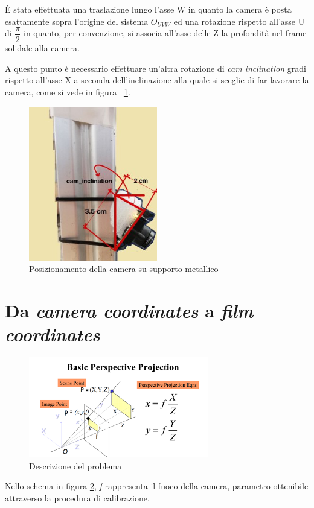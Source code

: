 È stata effettuata una traslazione lungo l'asse W in quanto la camera è posta esattamente sopra l'origine del sistema $O_{UVW}$ ed una rotazione rispetto all'asse U di $ \dfrac{\pi}{2}$ in quanto, per convenzione, si associa all'asse delle Z la profondità nel frame solidale alla camera.

A questo punto è necessario effettuare un'altra rotazione di \textit{cam inclination} gradi rispetto all'asse X a seconda dell'inclinazione alla quale si sceglie di far lavorare la camera, come si vede in figura ~\ref{fig:cameraSupport}.

\begin{figure}
	\centering
	\includegraphics[width=0.5\textwidth]{Immagini/CameraSupport.jpg}
	\caption{Posizionamento della camera su supporto metallico}
	\label{fig:cameraSupport}
\end{figure}

\section{Da \textit{camera coordinates} a \textit{film coordinates}}
\begin{figure}[H]
	\centering
	\includegraphics[width=0.7\textwidth]{Immagini/perspective_projection.png}
	\caption{Descrizione del problema}
	\label{fig:perspective_projection}
\end{figure}
Nello schema in figura \ref{fig:perspective_projection}, \textit{f} rappresenta il fuoco della camera, parametro ottenibile attraverso la procedura di calibrazione.

